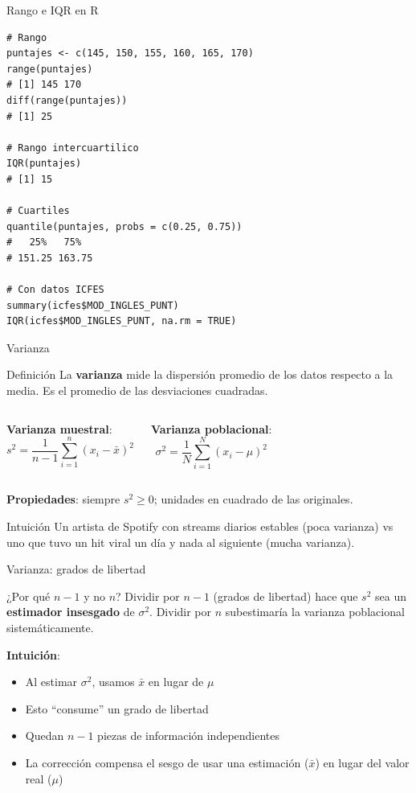 \documentclass[aspectratio=169, 11pt]{beamer}
\begin{document}
\begin{frame}[fragile]{Rango e IQR en R}
\begin{lstlisting}[basicstyle=\ttfamily\scriptsize]
# Rango
puntajes <- c(145, 150, 155, 160, 165, 170)
range(puntajes)
# [1] 145 170
diff(range(puntajes))
# [1] 25

# Rango intercuartilico
IQR(puntajes)
# [1] 15

# Cuartiles
quantile(puntajes, probs = c(0.25, 0.75))
#   25%   75%
# 151.25 163.75

# Con datos ICFES
summary(icfes$MOD_INGLES_PUNT)
IQR(icfes$MOD_INGLES_PUNT, na.rm = TRUE)
\end{lstlisting}
\end{frame}

\begin{frame}{Varianza}
\begin{block}{Definición}
La \textbf{varianza} mide la dispersión promedio de los datos respecto a la media. Es el promedio de las desviaciones cuadradas.
\end{block}

\begin{columns}[T]
\textbf{Varianza muestral}:
\[
s^2 = \frac{1}{n-1} \sum_{i=1}^n (x_i - \bar{x})^2
\]

\textbf{Varianza poblacional}:
\[
\sigma^2 = \frac{1}{N} \sum_{i=1}^N (x_i - \mu)^2
\]
\end{columns}

\vspace{0.5em}
\textbf{Propiedades}: siempre $s^2 \geq 0$; unidades en cuadrado de las originales.

\begin{exampleblock}{Intuici\'on}
Un artista de Spotify con streams diarios estables (poca varianza) vs uno que tuvo un hit viral un d\'ia y nada al siguiente (mucha varianza).
\end{exampleblock}
\end{frame}

\begin{frame}{Varianza: grados de libertad}
\begin{alertblock}{¿Por qué $n-1$ y no $n$?}
Dividir por $n-1$ (grados de libertad) hace que $s^2$ sea un \textbf{estimador insesgado} de $\sigma^2$. Dividir por $n$ subestimaría la varianza poblacional sistemáticamente.
\end{alertblock}

\vspace{1em}
\textbf{Intuición}:
\begin{itemize}
\item Al estimar $\sigma^2$, usamos $\bar{x}$ en lugar de $\mu$
\item Esto ``consume'' un grado de libertad
\item Quedan $n-1$ piezas de información independientes
\item La corrección compensa el sesgo de usar una estimación ($\bar{x}$) en lugar del valor real ($\mu$)
\end{itemize}
\end{frame}
\end{document}
